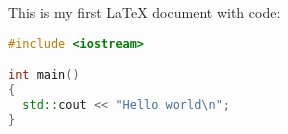 \documentclass{article}
\begin{document}
This is my first LaTeX document with code:

\begin{lstlisting}[language=C++,showstringspaces=false,frame=single]
#include <iostream>

int main()
{
  std::cout << "Hello world\n";
}
\end{lstlisting}
\end{document}
